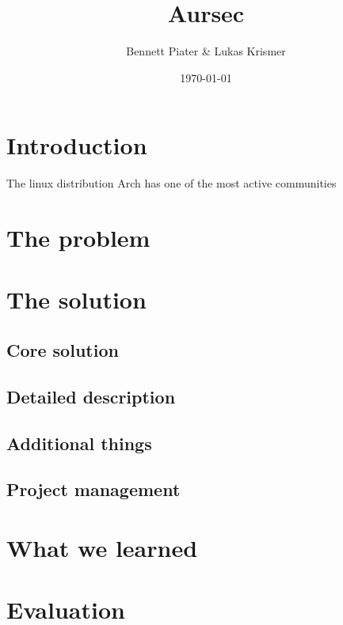 \documentclass{scrartcl}
\title{Aursec}
\author{Bennett Piater \& Lukas Krismer}
\date{\today}
\begin{document}
  \thispagestyle{empty}

  
  
  \begin{abstract}
  \end{abstract}

  \tableofcontents
  \listoffigures
  \listoftables
  \pagebreak


  \section{Introduction}
  The linux distribution Arch has one of the most active communities 

  \section{The problem}

  \section{The solution}
    \subsection{Core solution}
    \subsection{Detailed description}
    \subsection{Additional things}
    \subsection{Project management}

  \section{What we learned}

  \section{Evaluation}

  \pagebreak
  
  
\end{document}
